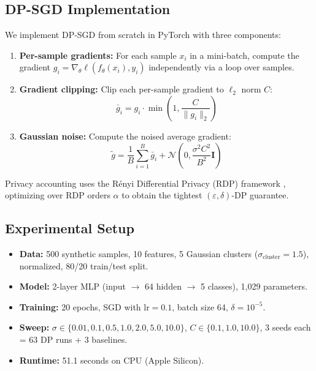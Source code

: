 \documentclass[11pt,a4paper]{article}
\begin{document}
\subsection{DP-SGD Implementation}

We implement DP-SGD from scratch in PyTorch with three components:

\begin{enumerate}
    \item \textbf{Per-sample gradients:} For each sample $x_i$ in a
    mini-batch, compute the gradient $g_i = \nabla_\theta \ell(f_\theta(x_i), y_i)$
    independently via a loop over samples.

    \item \textbf{Gradient clipping:} Clip each per-sample gradient to
    $\ell_2$ norm $C$:
    \[
        \bar{g}_i = g_i \cdot \min\!\left(1, \frac{C}{\|g_i\|_2}\right)
    \]

    \item \textbf{Gaussian noise:} Compute the noised average gradient:
    \[
        \tilde{g} = \frac{1}{B}\sum_{i=1}^{B} \bar{g}_i
        + \mathcal{N}\!\left(0, \frac{\sigma^2 C^2}{B^2} \mathbf{I}\right)
    \]
\end{enumerate}

Privacy accounting uses the R\'{e}nyi Differential Privacy (RDP) framework
\cite{mironov2017renyi}, optimizing over RDP orders $\alpha$ to obtain the
tightest $(\varepsilon, \delta)$-DP guarantee.

\subsection{Experimental Setup}

\begin{itemize}
    \item \textbf{Data:} 500 synthetic samples, 10 features, 5 Gaussian
    clusters ($\sigma_{\text{cluster}} = 1.5$), normalized, 80/20 train/test split.
    \item \textbf{Model:} 2-layer MLP (input $\to$ 64 hidden $\to$ 5 classes),
    1,029 parameters.
    \item \textbf{Training:} 20 epochs, SGD with $\text{lr}=0.1$,
    batch size 64, $\delta = 10^{-5}$.
    \item \textbf{Sweep:} $\sigma \in \{0.01, 0.1, 0.5, 1.0, 2.0, 5.0, 10.0\}$,
    $C \in \{0.1, 1.0, 10.0\}$, 3 seeds each = 63 DP runs + 3 baselines.
    \item \textbf{Runtime:} 51.1 seconds on CPU (Apple Silicon).
\end{itemize}
\end{document}

